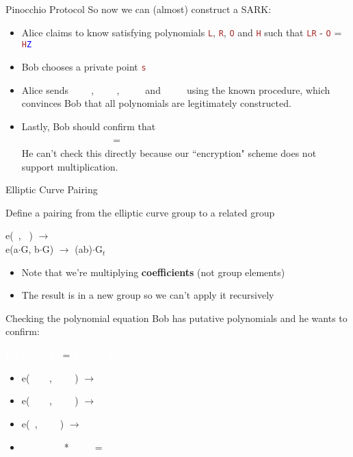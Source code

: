 \documentclass[dvipsnames]{beamer}
\newcommand{\pub}[1]{\textcolor{blue}{\texttt{#1}}}
\newcommand{\priv}[1]{\textcolor{brown}{\texttt{#1}}}
\newcommand{\enc}[1]{\colorbox{SkyBlue!75}{\textcolor{white}{\texttt{#1}}}}
\newcommand{\encB}[1]{\colorbox{PineGreen}{\textcolor{white}{\texttt{#1}}}}
\newcommand{\pairing}[3]{e(\enc{#1}, \enc{#2}) $\rightarrow$ \encB{#3}}
\begin{document}
    \begin{frame}{Pinocchio Protocol}
        So now we can (almost) construct a SARK:
        \begin{itemize}
            \item Alice claims to know satisfying polynomials \priv{L}, \priv{R}, \priv{O} and \priv{H} such that \priv{LR} - \priv{O} = \priv{H}\pub{Z}
            \item Bob chooses a private point \priv{s}
            \item Alice sends \enc{L(s)}, \enc{R(s)}, \enc{O(s)} and \enc{H(s)} using the known procedure, which convinces Bob that all polynomials are legitimately constructed.
            \item  Lastly, Bob should confirm that\\
            \enc{L(s) * R(s) - O(s)} = \enc{Z(s) * H(s)}
            \\He can't check this directly because our ``encryption" scheme does not support multiplication.
        \end{itemize}
    \end{frame}

    \begin{frame}{Elliptic Curve Pairing}
        \begin{block}{}
            Define a pairing from the elliptic curve group to a related group
            \begin{center}
                \pairing{a}{b}{ab}\\
                \vspace{0.2cm}
                e(a$\cdot$G, b$\cdot$G) $\rightarrow$ (ab)$\cdot$G$_t$
            \end{center}
        \end{block}

        \begin{itemize}
            \item Note that we're multiplying \textbf{coefficients} (not group elements)
            \item The result is in a new group so we can't apply it recursively
        \end{itemize}
    \end{frame}

    \begin{frame}{Checking the polynomial equation}
        Bob has putative polynomials and he wants to confirm:\\
        \begin{center}
            \enc{L(s) * R(s)} = \enc{Z(s) * H(s) + O(s)}
        \end{center}

        \begin{itemize}
            \item \pairing{L(s)}{R(s)}{L(s)R(s)}
            \item \pairing{Z(s)}{H(s)}{Z(s)H(s)}
            \item \pairing{1}{O(s)}{O(s)}
            \item \encB{Z(s)H(s)} * \encB{O(s)} =  \encB{Z(s)H(s) + O(s)}
        \end{itemize}
    \end{frame}
\end{document}
